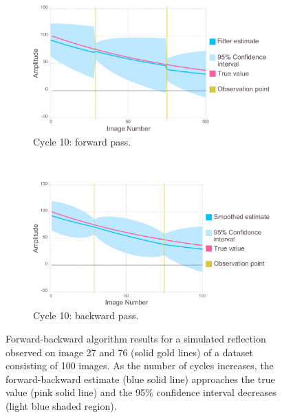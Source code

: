 \begin{figure}
    \ContinuedFloat
    \begin{subfigure}[b]{1.0\textwidth}
        \centering
        \includegraphics[width=\textwidth]{figures/datared/intDecSim_Filt10.pdf}
        \caption{Cycle 10: forward pass.}
        \label{fig:UKF simulation results - cycle 10 - good}
    \end{subfigure}
    \\
    \begin{subfigure}[b]{1.0\textwidth}
        \centering
        \includegraphics[width=\textwidth]{figures/datared/intDecSim10.pdf}
        \caption{Cycle 10: backward pass.}
        \label{fig:URTSS simulation results - cycle 10 - good}
    \end{subfigure}
    \caption[Forward-backward algorithm results for simulated data for a strong reflection.]{Forward-backward algorithm results for a simulated reflection observed on image 27 and 76 (solid gold lines) of a dataset consisting of 100 images.
    As the number of cycles increases, the forward-backward estimate (blue solid line) approaches the true value (pink solid line) and the 95\% confidence interval decreases (light blue shaded region).}
    \label{fig:forward-backward algorithm simulation results - good}
\end{figure}

